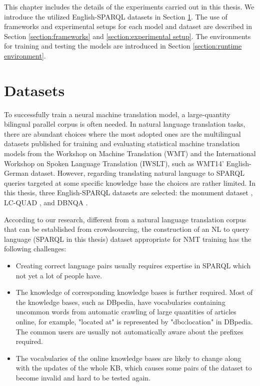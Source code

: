 
This chapter includes the details of the experiments carried out in this thesis. We introduce the utilized English-SPARQL datasets in Section \ref{section:datasets}. The use of frameworks and experimental setups for each model and dataset are described in Section \ref{section:frameworks} and \ref{section:experimental setup}. The environments for training and testing the models are introduced in Section \ref{section:runtime environment}.

\section{Datasets} \label{section:datasets}

To successfully train a neural machine translation model, a large-quantity bilingual parallel corpus is often needed. In natural language translation tasks, there are abundant choices where the most adopted ones are the multilingual datasets published for training and evaluating statistical machine translation models from the Workshop on Machine Translation (WMT) and the International Workshop on Spoken Language Translation (IWSLT), such as WMT14' English-German dataset. However, regarding translating natural language to SPARQL queries targeted at some specific knowledge base the choices are rather limited. In this thesis, three English-SPARQL datasets are selected: the monument dataset \cite{Soru2018a}, LC-QUAD \cite{trivedi2017lc}, and DBNQA \cite{Soru2018dbnqa}. 

According to our research, different from a natural language translation corpus that can be established from crowdsourcing, the construction of an NL to query language (SPARQL in this thesis) dataset appropriate for NMT training has the following challenges:
\begin{itemize}
\item Creating correct language pairs usually requires expertise in SPARQL which not yet a lot of people have. 
\item The knowledge of corresponding knowledge bases is further required. Most of the knowledge bases, such as DBpedia, have vocabularies containing uncommon words from automatic crawling of large quantities of articles online, for example, "located at" is represented by "dbo:location" in DBpedia. The common users are usually not automatically aware about the prefixes required.
\item The vocabularies of the online knowledge bases are likely to change along with the updates of the whole KB, which causes some pairs of the dataset to become invalid and hard to be tested again.
\end{itemize}

